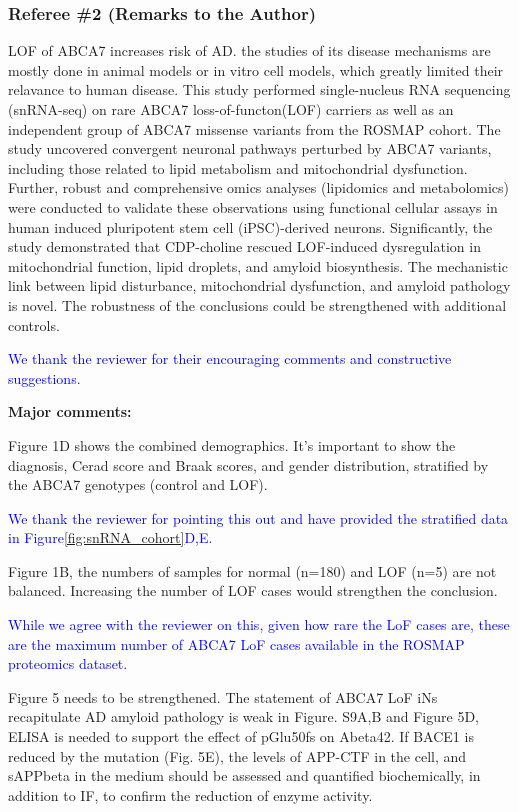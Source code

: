 \subsubsection*{Referee \#2 (Remarks to the Author)}
LOF of ABCA7 increases risk of AD. the studies of its disease mechanisms are mostly done in animal models or in vitro cell models, which greatly limited their relavance to human disease. This study performed single-nucleus RNA sequencing (snRNA-seq) on rare ABCA7 loss-of-functon(LOF) carriers as well as an independent group of ABCA7 missense variants from the ROSMAP cohort. The study uncovered convergent neuronal pathways perturbed by ABCA7 variants, including those related to lipid metabolism and mitochondrial dysfunction. Further, robust and comprehensive omics analyses (lipidomics and metabolomics) were conducted to validate these observations using functional cellular assays in human induced pluripotent stem cell (iPSC)-derived neurons. Significantly, the study demonstrated that CDP-choline rescued LOF-induced dysregulation in mitochondrial function, lipid droplets, and amyloid biosynthesis. The mechanistic link between lipid disturbance, mitochondrial dysfunction, and amyloid pathology is novel. The robustness of the conclusions could be strengthened with additional controls.

\textcolor{blue}{We thank the reviewer for their encouraging comments and constructive suggestions.}

\textbf{Major comments:}

Figure 1D shows the combined demographics. It’s important to show the diagnosis, Cerad score and Braak scores, and gender distribution, stratified by the ABCA7 genotypes (control and LOF).

\textcolor{blue}{We thank the reviewer for pointing this out and have provided the stratified data in Figure\ref{fig:snRNA_cohort}D,E.}

Figure 1B, the numbers of samples for normal (n=180) and LOF (n=5) are not balanced. Increasing the number of LOF cases would strengthen the conclusion.

\textcolor{blue}{While we agree with the reviewer on this, given how rare the LoF cases are, these are the maximum number of ABCA7 LoF cases available in the ROSMAP proteomics dataset.}

Figure 5 needs to be strengthened. The statement of ABCA7 LoF iNs recapitulate AD amyloid pathology is weak in Figure. S9A,B and Figure 5D, ELISA is needed to support the effect of pGlu50fs on Abeta42. If BACE1 is reduced by the mutation (Fig. 5E), the levels of APP-CTF in the cell, and sAPPbeta in the medium should be assessed and quantified biochemically, in addition to IF, to confirm the reduction of enzyme activity.

